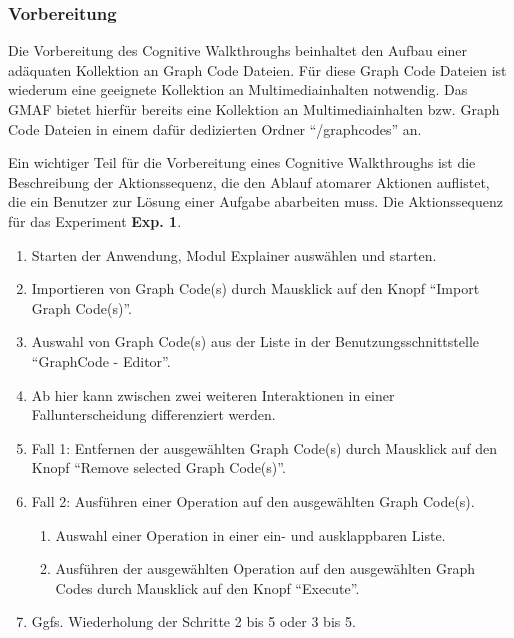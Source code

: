 
\subsubsection{Vorbereitung}
\label{sec5:eval:subsubsec:exp-1:preparation}
Die Vorbereitung des Cognitive Walkthroughs beinhaltet den Aufbau einer adäquaten Kollektion an Graph Code Dateien.
Für diese Graph Code Dateien ist wiederum eine geeignete Kollektion an Multimediainhalten notwendig.
Das GMAF bietet hierfür bereits eine Kollektion an Multimediainhalten bzw. Graph Code Dateien in einem dafür dedizierten Ordner \enquote{/graphcodes} an.

Ein wichtiger Teil für die Vorbereitung eines Cognitive Walkthroughs ist die Beschreibung der Aktionssequenz, die den Ablauf atomarer Aktionen auflistet, die ein Benutzer zur Lösung einer Aufgabe abarbeiten muss.
Die Aktionssequenz für das Experiment \textbf{Exp. 1}.

\begin{tcolorbox}[minipage, colback=white, colframe=black, arc=0pt, outer arc=0pt]
  \begin{enumerate}
    \setlength{\itemsep}{1pt}
    \item Starten der Anwendung, Modul Explainer auswählen und starten.
    \item Importieren von Graph Code(s) durch Mausklick auf den Knopf \enquote{Import Graph Code(s)}.
    \item Auswahl von Graph Code(s) aus der Liste in der Benutzungsschnittstelle \enquote{GraphCode - Editor}.
    \tcbline
    \item[] Ab hier kann zwischen zwei weiteren Interaktionen in einer Fallunterscheidung differenziert werden.
    \tcbline
    \setcounter{enumi}{3}
    \item Fall 1: Entfernen der ausgewählten Graph Code(s) durch Mausklick auf den Knopf \enquote{Remove selected Graph Code(s)}.
    \item Fall 2: Ausführen einer Operation auf den ausgewählten Graph Code(s).
    \begin{enumerate}[label*=\arabic*.]
      \item Auswahl einer Operation in einer ein- und ausklappbaren Liste.
      \item Ausführen der ausgewählten Operation auf den ausgewählten Graph Codes durch Mausklick auf den Knopf \enquote{Execute}.
    \end{enumerate}
    \item Ggfs. Wiederholung der Schritte 2 bis 5 oder 3 bis 5.
  \end{enumerate}
\end{tcolorbox}

